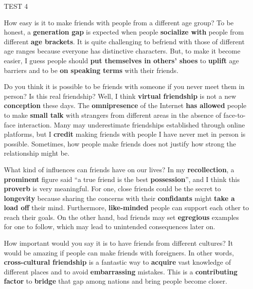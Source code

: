 \begin{glossarymc}[Cambridge 8]
\begin{test}{TEST 4}
    \begin{qa}{How easy is it to make friends with people from a different age group?}
    To be honest, a \textbf{generation gap} is expected when people \textbf{socialize with} people from different \textbf{age brackets}. It is quite challenging to befriend with those of different age ranges because everyone has distinctive characters. But, to make it become easier, I guess people should \textbf{put themselves in others’ shoes} to \textbf{uplift} age barriers and to be \textbf{on speaking terms} with their friends.
    \end{qa}

    \begin{qa}{Do you think it is possible to be friends with someone if you never meet them in person? Is this real friendship?}
    Well, I think \textbf{virtual friendship} is not a new \textbf{conception} these days. The \textbf{omnipresence} of the Internet \textbf{has allowed} people to make \textbf{small talk} with strangers from different areas in the absence of face-to-face interaction. Many may underestimate friendships established through online platforms, but I \textbf{credit} making friends with people I have never met in person is possible. Sometimes, how people make friends does not justify how strong the relationship might be.
    \end{qa}

    \begin{qa}{What kind of influences can friends have on our lives?}
    In my \textbf{recollection}, a \textbf{prominent} figure said “a true friend is the best \textbf{possession}”, and I think this \textbf{proverb} is very meaningful. For one, close friends could be the secret to \textbf{longevity} because sharing the concerns with their \textbf{confidants} might \textbf{take a load off} their mind. Furthermore, \textbf{like-minded} people can support each other to reach their goals. On the other hand, bad friends may set \textbf{egregious} examples for one to follow, which may lead to unintended consequences later on.
    \end{qa}

    \begin{qa}{How important would you say it is to have friends from different cultures?}
    It would be amazing if people can make friends with foreigners. In other words, \textbf{cross-cultural friendship} is a fantastic way to \textbf{acquire} vast knowledge of different places and to avoid \textbf{embarrassing} mistakes. This is a \textbf{contributing factor} to \textbf{bridge} that gap among nations and bring people become closer.
    \end{qa}


\end{test}
\end{glossarymc}
